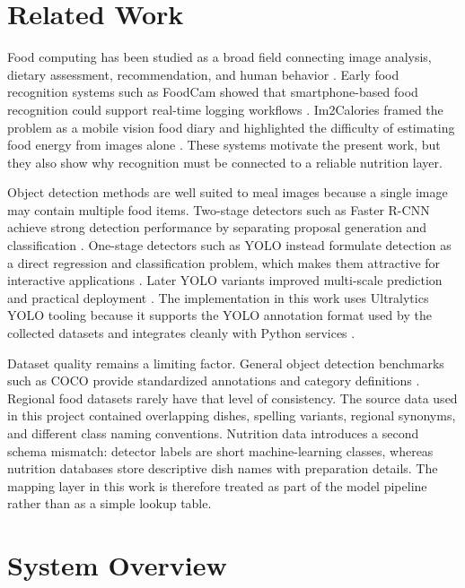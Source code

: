 \documentclass[conference]{IEEEtran}
\begin{document}
\section{Related Work}

Food computing has been studied as a broad field connecting image analysis, dietary assessment, recommendation, and human behavior \cite{min2019food}. Early food recognition systems such as FoodCam showed that smartphone-based food recognition could support real-time logging workflows \cite{kawano2014foodcam}. Im2Calories framed the problem as a mobile vision food diary and highlighted the difficulty of estimating food energy from images alone \cite{meyers2015im2calories}. These systems motivate the present work, but they also show why recognition must be connected to a reliable nutrition layer.

Object detection methods are well suited to meal images because a single image may contain multiple food items. Two-stage detectors such as Faster R-CNN achieve strong detection performance by separating proposal generation and classification \cite{ren2015fasterrcnn}. One-stage detectors such as YOLO instead formulate detection as a direct regression and classification problem, which makes them attractive for interactive applications \cite{redmon2016yolo}. Later YOLO variants improved multi-scale prediction and practical deployment \cite{redmon2018yolov3}. The implementation in this work uses Ultralytics YOLO tooling because it supports the YOLO annotation format used by the collected datasets and integrates cleanly with Python services \cite{ultralytics2024}.

Dataset quality remains a limiting factor. General object detection benchmarks such as COCO provide standardized annotations and category definitions \cite{lin2014coco}. Regional food datasets rarely have that level of consistency. The source data used in this project contained overlapping dishes, spelling variants, regional synonyms, and different class naming conventions. Nutrition data introduces a second schema mismatch: detector labels are short machine-learning classes, whereas nutrition databases store descriptive dish names with preparation details. The mapping layer in this work is therefore treated as part of the model pipeline rather than as a simple lookup table.

\section{System Overview}
\end{document}
